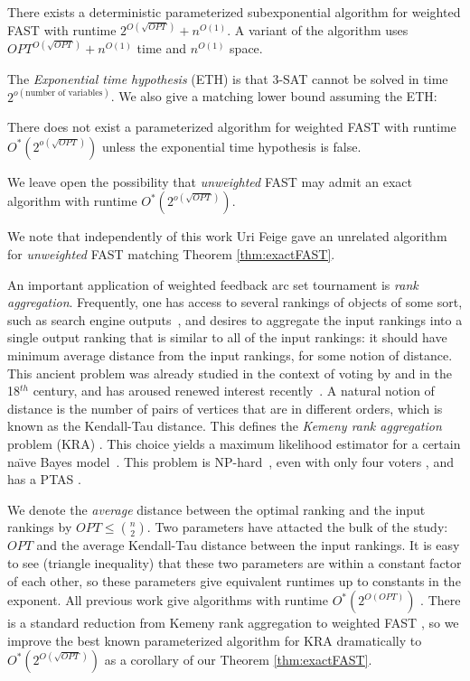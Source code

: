 \documentclass[envcountsame,oribibl]{llncs}
\newcommand{\fast}{\textsc{FAST}}
\begin{document}
\begin{theorem} \label{thm:exactFAST}
There exists a deterministic parameterized subexponential
   algorithm for weighted \fast{} with runtime $2^{O(\sqrt{OPT})} + n^{O(1)}$. A variant of the algorithm uses $OPT^{O(\sqrt{OPT})} + n^{O(1)}$ time and $n^{O(1)}$ space.
\end{theorem}

The \emph{Exponential time hypothesis} (ETH) \cite{Impagliazzo01} is that 3-SAT cannot be solved in time $2^{o(\text{number of variables})}$. We also give a matching lower bound assuming the ETH:

\begin{theorem} \label{thm:exactLB}
There does not exist a parameterized algorithm for weighted \fast{} with runtime $O^*(2^{o(\sqrt{OPT})})$ unless the exponential time hypothesis \cite{Impagliazzo01} is false.
\end{theorem}

We leave open the possibility that \emph{unweighted} \fast{} may admit an exact algorithm with runtime $O^*(2^{o(\sqrt{OPT})})$.

We note that independently of this work Uri Feige \cite{Feige09} gave an unrelated algorithm for \emph{unweighted} \fast{} matching Theorem \ref{thm:exactFAST}.

\medskip

An important application of weighted feedback arc set tournament is {\em rank aggregation}. Frequently, one has access to several rankings of objects of some sort, such as search engine outputs~\citep{Dwork01}, and desires to aggregate the input rankings into a single output ranking that is similar to all of the input rankings: it should have minimum {average distance} from the input rankings, for some notion of distance. This ancient problem was already studied in the context of voting by \citep{Borda} and \citep{Condorcet} in the 18$^{th}$ century, and has aroused renewed interest recently~\citep{Dwork01,Conitzer06b}.  A natural notion of distance is the number of pairs of vertices that are in different orders, which is known as the Kendall-Tau distance. This defines the {\em Kemeny rank aggregation} problem (KRA) \citep{Kemeny59,Kemeny62}. This choice yields a maximum likelihood estimator for a certain na\"\i{}ve Bayes model~\citep{Young95}. This problem is NP-hard~\citep{Bartholdi89}, even with only four voters \citep{Dwork01}, and has a PTAS \cite{Mathieu09fast}.

We denote the \emph{average} distance between the optimal ranking and the input rankings by $OPT \le \binom{n}{2}$. Two parameters have attacted the bulk of the study: $OPT$ and the average Kendall-Tau distance between the input rankings. It is easy to see (triangle inequality) that these two parameters are within a constant factor of each other, so these parameters give equivalent runtimes up to constants in the exponent. All previous work give algorithms with runtime $O^*(2^{O(OPT)})$ \cite{Betzler09}. There is a standard reduction from Kemeny rank aggregation to weighted \fast{} \cite{Ailon08aggregating,Coppersmith06,Mathieu09fast}, so we improve the best known parameterized algorithm for KRA dramatically to $O^*(2^{O(\sqrt{OPT})})$ as a corollary of our Theorem \ref{thm:exactFAST}.
\end{document}
